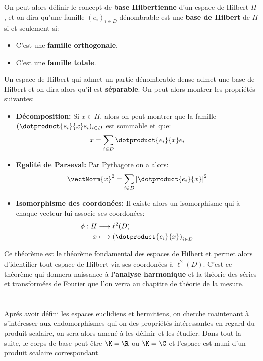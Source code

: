 \subsection*{}
On peut alors définir le concept de \textbf{base Hilbertienne} d'un espace de Hilbert \( H \), et on dira qu'une famille \( (e_i)_{i \in D} \) dénombrable est une \textbf{base de Hilbert} de \( H \) si et seulement si:
\begin{itemize}
   \item C'est une \textbf{famille orthogonale}.
   \item C'est une \textbf{famille totale}.
\end{itemize}
Un espace de Hilbert qui admet un partie dénombrable dense admet une base de Hilbert et on dira alors qu'il est \textbf{séparable}. On peut alors montrer les propriétés suivantes:
\begin{itemize}
   \item \textbf{Décomposition:} Si \( x \in H \), alors on peut montrer que la famille \( (\dotproduct{e_i}{x}e_i)_{i \in D} \) est sommable et que:
   \[ 
      x = \sum_{i \in D}\dotproduct{e_i}{x}e_i
   \]
   \item \textbf{Egalité de Parseval:} Par Pythagore on a alors:
   \[ 
      \vectNorm{x}^2 = \sum_{i \in D} \left|\dotproduct{e_i}{x}\right|^2
   \]
   \item \textbf{Isomorphisme des coordonées:} Il existe alors un isomorphisme qui à chaque vecteur lui associe ses coordonées:
   \[ 
      \begin{aligned}
         \phi : H &\longrightarrow \ell^2(D) \\
         x &\longmapsto \left(\dotproduct{e_i}{x}\right)_{i \in D}
      \end{aligned}
   \]
\end{itemize}
Ce théorème est le théorème fondamental des espaces de Hilbert et permet alors d'identifier tout espace de Hilbert via ses coordonées à \( \ell^2(D) \). C'est ce théorème qui donnera naissance à \textbf{l'analyse harmonique} et la théorie des séries et transformées de Fourier que l'on verra au chapitre de théorie de la mesure.
\chapter*{}
Aprés avoir défini les espaces euclidiens et hermitiens, on cherche maintenant à s'intéresser aux endomorphismes qui on des propriétés intéressantes en regard du produit scalaire, on sera alors amené à les définir et les étudier. Dans tout la suite, le corps de base peut être \(\K = \R\) ou \(\K = \C\) et l'espace est muni d'un produit scalaire correspondant.
